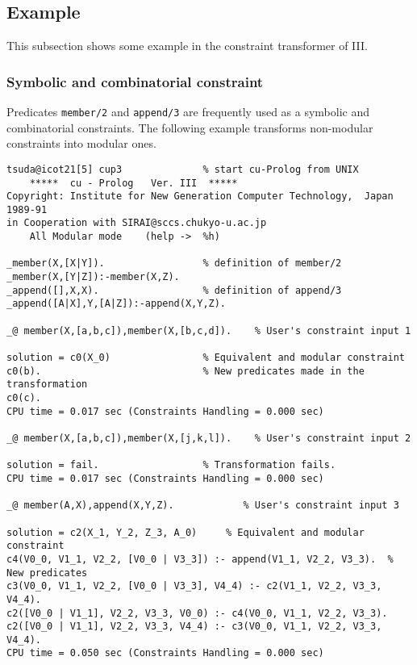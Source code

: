 \subsection{Example}
This subsection shows some example in the constraint transformer of
\cuprolog III. 

\subsubsection{Symbolic and combinatorial constraint}
Predicates {\tt member/2} and {\tt append/3} are frequently used as a
symbolic and combinatorial constraints. 
The following example transforms non-modular constraints into modular
ones.

\begin{verbatim}
tsuda@icot21[5] cup3              % start cu-Prolog from UNIX
	*****  cu - Prolog   Ver. III  *****
Copyright: Institute for New Generation Computer Technology,  Japan 1989-91
in Cooperation with SIRAI@sccs.chukyo-u.ac.jp
	All Modular mode	(help ->  %h)

_member(X,[X|Y]).                 % definition of member/2
_member(X,[Y|Z]):-member(X,Z).
_append([],X,X).                  % definition of append/3
_append([A|X],Y,[A|Z]):-append(X,Y,Z).

_@ member(X,[a,b,c]),member(X,[b,c,d]).    % User's constraint input 1

solution = c0(X_0)                % Equivalent and modular constraint
c0(b).                            % New predicates made in the transformation
c0(c).
CPU time = 0.017 sec (Constraints Handling = 0.000 sec)

_@ member(X,[a,b,c]),member(X,[j,k,l]).    % User's constraint input 2

solution = fail.                  % Transformation fails.
CPU time = 0.017 sec (Constraints Handling = 0.000 sec)

_@ member(A,X),append(X,Y,Z).            % User's constraint input 3

solution = c2(X_1, Y_2, Z_3, A_0)     % Equivalent and modular constraint
c4(V0_0, V1_1, V2_2, [V0_0 | V3_3]) :- append(V1_1, V2_2, V3_3).  % New predicates
c3(V0_0, V1_1, V2_2, [V0_0 | V3_3], V4_4) :- c2(V1_1, V2_2, V3_3, V4_4).
c2([V0_0 | V1_1], V2_2, V3_3, V0_0) :- c4(V0_0, V1_1, V2_2, V3_3).
c2([V0_0 | V1_1], V2_2, V3_3, V4_4) :- c3(V0_0, V1_1, V2_2, V3_3, V4_4).
CPU time = 0.050 sec (Constraints Handling = 0.000 sec)
\end{verbatim}

